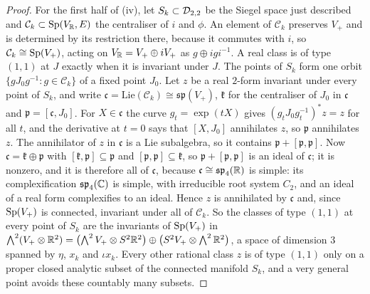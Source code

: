 \begin{proof}
For the first half of (iv), let $S_{k}\subset\mathcal{D}_{2,2}$ be the Siegel space
just described and $\mathcal{C}_{k}\subset\operatorname{Sp}(V_{\mathbb{R}},E)$ the centraliser of
$i$ and $\phi$. An element of $\mathcal{C}_{k}$ preserves $V_{+}$ and is
determined by its restriction there, because it commutes with $i$, so
$\mathcal{C}_{k}\cong\operatorname{Sp}(V_{+})$, acting on $V_{\mathbb{R}}=V_{+}\oplus iV_{+}$ as
$g\oplus igi^{-1}$. A real class is of type $(1,1)$ at $J$ exactly when it is
invariant under $J$. The points of $S_{k}$ form one orbit
$\{gJ_{0}g^{-1}:g\in\mathcal{C}_{k}\}$ of a fixed point $J_{0}$. Let $z$ be a
real $2$-form invariant under every point of $S_{k}$, and write
$\mathfrak{c}=\mathrm{Lie}(\mathcal{C}_{k})\cong\mathfrak{sp}(V_{+})$,
$\mathfrak{k}$ for the centraliser of $J_{0}$ in $\mathfrak{c}$ and
$\mathfrak{p}=[\mathfrak{c},J_{0}]$. For $X\in\mathfrak{c}$ the curve
$g_{t}=\exp(tX)$ gives $(g_{t}J_{0}g_{t}^{-1})^{*}z=z$ for all $t$, and the
derivative at $t=0$ says that $[X,J_{0}]$ annihilates $z$, so $\mathfrak{p}$
annihilates $z$. The annihilator of $z$ in $\mathfrak{c}$ is a Lie
subalgebra, so it contains $\mathfrak{p}+[\mathfrak{p},\mathfrak{p}]$. Now
$\mathfrak{c}=\mathfrak{k}\oplus\mathfrak{p}$ with
$[\mathfrak{k},\mathfrak{p}]\subseteq\mathfrak{p}$ and
$[\mathfrak{p},\mathfrak{p}]\subseteq\mathfrak{k}$, so
$\mathfrak{p}+[\mathfrak{p},\mathfrak{p}]$ is an ideal of $\mathfrak{c}$;
it is nonzero, and it is therefore all of $\mathfrak{c}$, because
$\mathfrak{c}\cong\mathfrak{sp}_{4}(\mathbb{R})$ is simple: its complexification
$\mathfrak{sp}_{4}(\mathbb{C})$ is simple, with irreducible root system $C_{2}$, and
an ideal of a real form complexifies to an ideal. Hence $z$ is annihilated by
$\mathfrak{c}$ and, since $\operatorname{Sp}(V_{+})$ is connected, invariant under all of
$\mathcal{C}_{k}$. So the classes of type $(1,1)$ at every point of $S_{k}$
are the invariants of $\operatorname{Sp}(V_{+})$ in $\bigwedge^{2}(V_{+}\otimes\mathbb{R}^{2})
=\bigl(\bigwedge^{2}V_{+}\otimes S^{2}\mathbb{R}^{2}\bigr)
\oplus\bigl(S^{2}V_{+}\otimes\bigwedge^{2}\mathbb{R}^{2}\bigr)$, a space of dimension
$3$ spanned by $\eta$, $x_{k}$ and $\iota x_{k}$. Every other rational
class $z$ is of type $(1,1)$ only on a proper closed analytic subset of the
connected manifold $S_{k}$, and a very general point avoids these countably
many subsets.


\end{proof}
